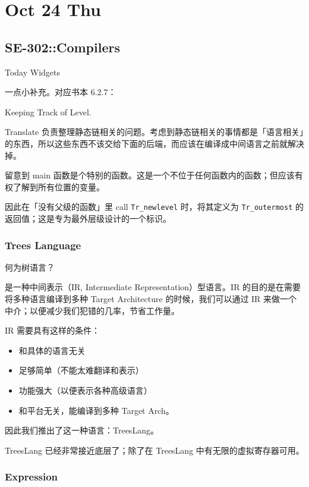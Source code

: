 \documentclass[
]{article}
\date{}
\begin{document}
\hypertarget{header-n0}{%
\section{Oct 24 Thu}\label{header-n0}}

\hypertarget{header-n2}{%
\subsection{SE-302::Compilers}\label{header-n2}}

Today Widgets

一点小补充。对应书本 6.2.7：

Keeping Track of Level.

Translate
负责整理静态链相关的问题。考虑到静态链相关的事情都是「语言相关」的东西，所以这些东西不该交给下面的后端，而应该在编译成中间语言之前就解决掉。

留意到 main
函数是个特别的函数。这是一个不位于任何函数内的函数；但应该有权了解到所有位置的变量。

因此在「没有父级的函数」里 call \texttt{Tr\_newlevel} 时，将其定义为
\texttt{Tr\_outermost} 的返回值；这是专为最外层级设计的一个标识。

\hypertarget{header-n9}{%
\subsubsection{Trees Language}\label{header-n9}}

何为树语言？

是一种中间表示（IR, Intermediate Representation）型语言。IR
的目的是在需要将多种语言编译到多种 Target Architecture
的时候，我们可以通过 IR
来做一个中介；以便减少我们犯错的几率，节省工作量。

IR 需要具有这样的条件：

\begin{itemize}
\item
  和具体的语言无关
\item
  足够简单（不能太难翻译和表示）
\item
  功能强大（以便表示各种高级语言）
\item
  和平台无关，能编译到多种 Target Arch。
\end{itemize}

因此我们推出了这一种语言：TreesLang。

TreesLang 已经非常接近底层了；除了在 TreesLang
中有无限的虚拟寄存器可用。

\hypertarget{header-n24}{%
\subsubsection{Expression}\label{header-n24}}
\end{document}
